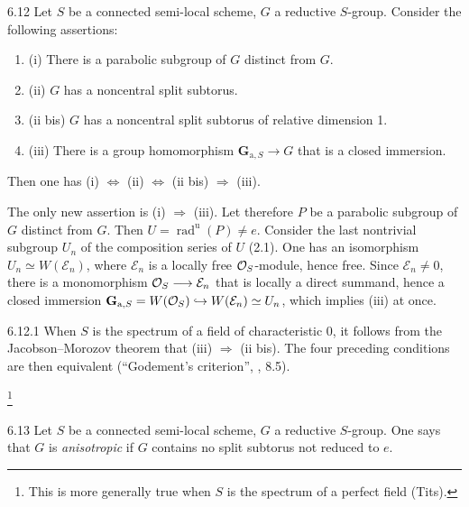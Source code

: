 \begin{corollary}{6.12}\label{XXVI.6.12}
Let $S$ be a connected semi-local scheme, $G$ a reductive $S$-group. Consider the following assertions:
\begin{enumerate}[label={}]
\item (i) There is a parabolic subgroup of $G$ distinct from $G$.
\item (ii) $G$ has a noncentral split subtorus.
\item (ii bis) $G$ has a noncentral split subtorus of relative dimension 1.
\item (iii) There is a group homomorphism $\mathbf{G}_{\mathrm a,S}\to G$ that is a closed immersion.
\end{enumerate}
Then one has (i) $\Leftrightarrow$ (ii) $\Leftrightarrow$ (ii bis) $\Rightarrow$ (iii).
\end{corollary}
The only new assertion is (i) $\Rightarrow$ (iii). Let therefore $P$ be a parabolic subgroup of $G$ distinct from $G$. Then $U=\operatorname{rad}^{\mathrm u}(P)\neq e$. Consider the last nontrivial subgroup $U_n$ of the composition series of $U$ (2.1). One has an isomorphism $U_n\simeq W(\mathcal E_n)$, where $\mathcal E_n$ is a locally free $\mathcal{O}_S$-module, hence free.
Since $\mathcal E_n\neq0$, there is a monomorphism $\mathcal{O}_S\longrightarrow\mathcal E_n$ that is locally a direct summand, hence a closed immersion $\mathbf{G}_{\mathrm a,S}=W(\mathcal{O}_S)\hookrightarrow W(\mathcal E_n)\simeq U_n$, which implies (iii) at once.

\begin{remark}{6.12.1}\label{XXVI.6.12.1}
When $S$ is the spectrum of a field of characteristic 0, it follows from the Jacobson--Morozov theorem that (iii) $\Rightarrow$ (ii bis). The four preceding conditions are then equivalent (``Godement's criterion'', \cf \cite{BT65}, 8.5).\begingroup\renewcommand{\thefootnote}{*}\addtocounter{footnote}{-1}\footnote{This is more generally true when $S$ is the spectrum of a perfect field (Tits).\begingroup\renewcommand{\thefootnote}{31}\ndemark\endgroup}\endgroup{}
\end{remark}

\begin{definition}{6.13}\label{XXVI.6.13}
Let $S$ be a connected semi-local scheme, $G$ a reductive $S$-group. One says that $G$ is \emph{anisotropic} if $G$ contains no split subtorus not reduced to $e$.
\end{definition}

